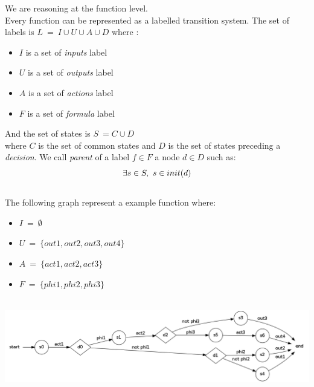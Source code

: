 \documentclass[a4paper]{report}
\begin{document}
We are reasoning at the function level.\\
Every function can be represented as a labelled transition system. The set of labels is $L\ =\ I \cup U \cup A \cup D$ where :\\
\begin{itemize}
\item $I$ is a set of \textit{inputs} label
\item $U$ is a set of \textit{outputs} label
\item $A$ is a set of \textit{actions} label
\item $F$ is a set of \textit{formula} label
\end{itemize}
And the set of states is $S\ = C \cup D$\\
where $C$ is the set of common states and $D$ is the set of states preceding a \textit{decision}.
We call \textit{parent} of a label $f \in F$ a node $d \in D$ such as:\\
\[
\exists s \in S,\ s \in init(d)\\
\]
$ $\\
\newline
The following graph represent a example function where:
\begin{itemize}
\item $I\ =\ \emptyset$
\item $U\ =\ \{out1, out2, out3, out4\}$
\item $A\ =\ \{act1, act2, act3\}$
\item $F\ =\ \{phi1, phi2, phi3\}$
\end{itemize}
$ $\\
\includegraphics[scale=0.3]{../graphviz/LTSExample.png}
$ $\\
\newline
\end{document}
